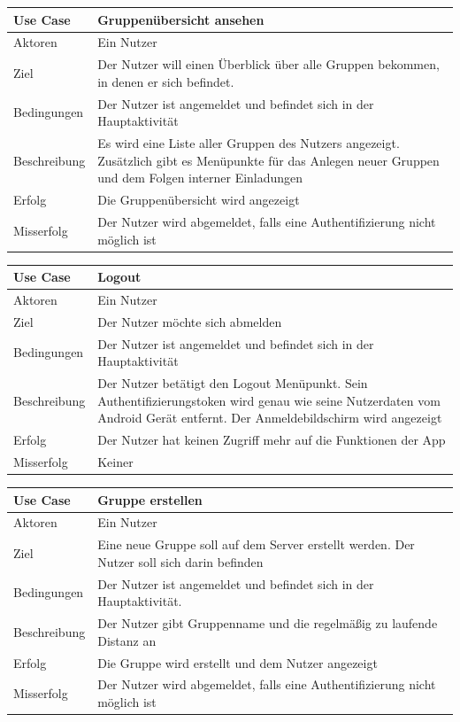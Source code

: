 \begin{tabular}{|p{}|p{}|}
\hline
\textbf{Use Case} & \textbf{Gruppenübersicht ansehen} \\ \hline
Aktoren &  Ein Nutzer \\ \hline
Ziel &  Der Nutzer will einen Überblick über alle Gruppen bekommen, in denen er sich befindet. \\ \hline
Bedingungen &  Der Nutzer ist angemeldet und befindet sich in der Hauptaktivität\\ \hline
Beschreibung &  Es wird eine Liste aller Gruppen des Nutzers angezeigt. Zusätzlich gibt es Menüpunkte für das Anlegen neuer Gruppen und dem Folgen interner Einladungen \\ \hline
Erfolg & Die Gruppenübersicht wird angezeigt \\ \hline
Misserfolg & Der Nutzer wird abgemeldet, falls eine Authentifizierung nicht möglich ist \\ \hline
\hline \end{tabular}
\begin{tabular}{|p{}|p{}|}
\hline
\textbf{Use Case} & \textbf{Logout} \\ \hline
Aktoren &  Ein Nutzer \\ \hline
Ziel &  Der Nutzer möchte sich abmelden \\ \hline
Bedingungen &  Der Nutzer ist angemeldet und befindet sich in der Hauptaktivität \\ \hline
Beschreibung & Der Nutzer betätigt den Logout Menüpunkt. Sein Authentifizierungstoken wird genau wie seine Nutzerdaten vom Android Gerät entfernt. Der Anmeldebildschirm wird angezeigt \\ \hline
Erfolg & Der Nutzer hat keinen Zugriff mehr auf die Funktionen der App\\ \hline
Misserfolg & Keiner \\ \hline
\hline \end{tabular}
\begin{tabular}{|p{}|p{}|}
\hline
\textbf{Use Case} & \textbf{Gruppe erstellen} \\ \hline
Aktoren &  Ein Nutzer \\ \hline
Ziel &  Eine neue Gruppe soll auf dem Server erstellt werden. Der Nutzer soll sich darin befinden \\ \hline
Bedingungen &  Der Nutzer ist angemeldet und befindet sich in der Hauptaktivität. \\ \hline
Beschreibung &  Der Nutzer gibt Gruppenname und die regelmäßig zu laufende Distanz an \\ \hline
Erfolg & Die Gruppe wird erstellt und dem Nutzer angezeigt \\ \hline
Misserfolg & Der Nutzer wird abgemeldet, falls eine Authentifizierung nicht möglich ist \\ \hline
\hline \end{tabular}
